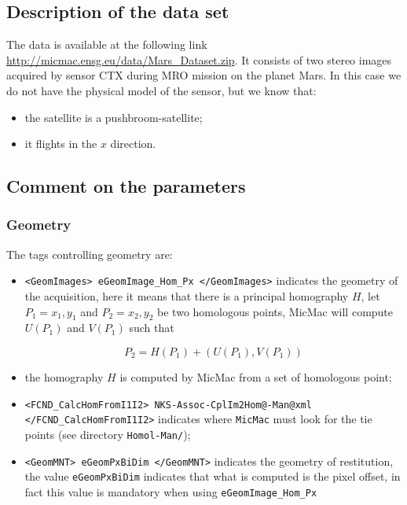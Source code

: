 \subsection{Description of the data set}

The data is available at the following link \url{http://micmac.ensg.eu/data/Mars_Dataset.zip}.
It consists of two stereo images acquired by sensor CTX during MRO mission on the planet Mars. In this case
we do not have the physical model of the sensor, but we know that:

\begin{itemize}
   \item the satellite is a  pushbroom-satellite;
   \item it flights in the $x$ direction.
\end{itemize}

\subsection{Comment on the parameters}

\subsubsection{Geometry}

The tags controlling geometry are:

\begin{itemize}

   \item   {\tt <GeomImages> eGeomImage\_Hom\_Px </GeomImages>} indicates the geometry of the acquisition,
          here it means that there is a principal homography $H$, let $P_1=x_1,y_1$ and  $P_2=x_2,y_2$ be two
          homologous points, MicMac will compute $U(P_1)$ and $V(P_1)$ such that

\begin{equation}
    P_2 = H(P_1) + (U(P_1),V(P_1))
\end{equation}

   \item  the homography $H$ is computed by MicMac from a set of homologous point;

   \item  {\tt  <FCND\_CalcHomFromI1I2> NKS-Assoc-CplIm2Hom@-Man@xml  </FCND\_CalcHomFromI1I2>}  indicates
          where {\tt MicMac} must look for the tie points (see directory {\tt Homol-Man/});


   \item  {\tt <GeomMNT> eGeomPxBiDim  </GeomMNT>} indicates the geometry of restitution,
          the value {\tt eGeomPxBiDim} indicates that what is computed is the pixel offset, in fact this value
          is mandatory when using {\tt eGeomImage\_Hom\_Px}


\end{itemize}

